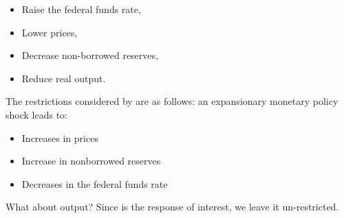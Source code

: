 \documentclass[
  12pt,
]{book}
\providecommand{\tightlist}{%
  \setlength{\itemsep}{0pt}\setlength{\parskip}{0pt}}
\theoremstyle{definition}
\theoremstyle{definition}
\theoremstyle{definition}
\theoremstyle{definition}
\theoremstyle{remark}
\begin{document}
\begin{itemize}
\tightlist
\item
  Raise the federal funds rate,
\item
  Lower prices,
\item
  Decrease non-borrowed reserves,
\item
  Reduce real output.
\end{itemize}

The restrictions considered by \citet{Uhlig_2005} are as follows: an expansionary monetary policy shock leads to:

\begin{itemize}
\tightlist
\item
  Increases in prices
\item
  Increase in nonborrowed reserves
\item
  Decreases in the federal funds rate
\end{itemize}

What about output? Since is the response of interest, we leave it un-restricted.
\end{document}
